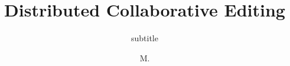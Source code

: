 \documentclass[12pt,french,fancyChapter,fancyPart,squeezeCommittee]{these-LUNAM}
\title{Distributed Collaborative Editing}
\subtitle{subtitle}
\author{M.}{Brice}{Nédelec}
\date{}
\begin{document}


\maketitle











\raggedright

\clearpage

\backmatter

\tableofcontents
\listoftables
\listoffigures
\end{document}
